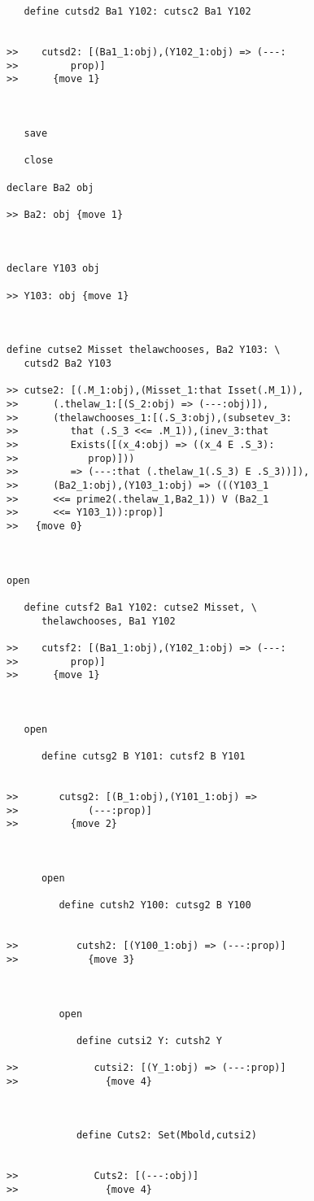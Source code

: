 \documentclass[12pt]{article}
\begin{document}
\begin{verbatim}
   define cutsd2 Ba1 Y102: cutsc2 Ba1 Y102


>>    cutsd2: [(Ba1_1:obj),(Y102_1:obj) => (---:
>>         prop)]
>>      {move 1}



   save

   close

declare Ba2 obj

>> Ba2: obj {move 1}



declare Y103 obj

>> Y103: obj {move 1}



define cutse2 Misset thelawchooses, Ba2 Y103: \
   cutsd2 Ba2 Y103

>> cutse2: [(.M_1:obj),(Misset_1:that Isset(.M_1)),
>>      (.thelaw_1:[(S_2:obj) => (---:obj)]),
>>      (thelawchooses_1:[(.S_3:obj),(subsetev_3:
>>         that (.S_3 <<= .M_1)),(inev_3:that
>>         Exists([(x_4:obj) => ((x_4 E .S_3):
>>            prop)]))
>>         => (---:that (.thelaw_1(.S_3) E .S_3))]),
>>      (Ba2_1:obj),(Y103_1:obj) => (((Y103_1
>>      <<= prime2(.thelaw_1,Ba2_1)) V (Ba2_1
>>      <<= Y103_1)):prop)]
>>   {move 0}



open

   define cutsf2 Ba1 Y102: cutse2 Misset, \
      thelawchooses, Ba1 Y102

>>    cutsf2: [(Ba1_1:obj),(Y102_1:obj) => (---:
>>         prop)]
>>      {move 1}



   open

      define cutsg2 B Y101: cutsf2 B Y101


>>       cutsg2: [(B_1:obj),(Y101_1:obj) =>
>>            (---:prop)]
>>         {move 2}



      open

         define cutsh2 Y100: cutsg2 B Y100


>>          cutsh2: [(Y100_1:obj) => (---:prop)]
>>            {move 3}



         open

            define cutsi2 Y: cutsh2 Y

>>             cutsi2: [(Y_1:obj) => (---:prop)]
>>               {move 4}



            define Cuts2: Set(Mbold,cutsi2)


>>             Cuts2: [(---:obj)]
>>               {move 4}


\end{verbatim}
\end{document}

